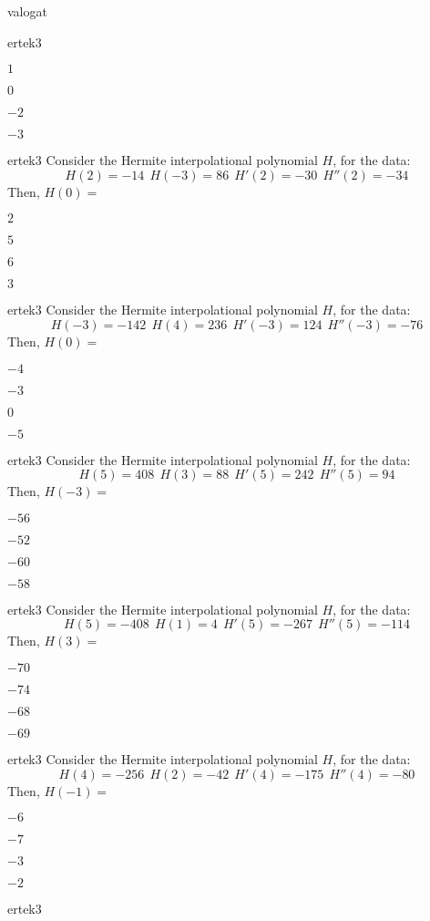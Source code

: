 \documentclass[12pt]{article}
\begin{document}
\begin{quiz}{valogat}
\begin{multi}{ertek3}
\item* $ 1 $
\item  $ 0 $
\item  $ -2 $
\item  $ -3 $
\end{multi}\begin{multi}{ertek3}
Consider the Hermite interpolational polynomial $H$, for the data:
$$
H(2)=-14 \ \ H(-3)=86 \ \ H'(2)=-30 \ \ H''(2)=-34
$$
Then, $H(0)=$
\item* $ 2 $
\item  $ 5 $
\item  $ 6 $
\item  $ 3 $
\end{multi}\begin{multi}{ertek3}
Consider the Hermite interpolational polynomial $H$, for the data:
$$
H(-3)=-142 \ \ H(4)=236 \ \ H'(-3)=124 \ \ H''(-3)=-76
$$
Then, $H(0)=$
\item* $ -4 $
\item  $ -3 $
\item  $ 0 $
\item  $ -5 $
\end{multi}\begin{multi}{ertek3}
Consider the Hermite interpolational polynomial $H$, for the data:
$$
H(5)=408 \ \ H(3)=88 \ \ H'(5)=242 \ \ H''(5)=94
$$
Then, $H(-3)=$
\item* $ -56 $
\item  $ -52 $
\item  $ -60 $
\item  $ -58 $
\end{multi}\begin{multi}{ertek3}
Consider the Hermite interpolational polynomial $H$, for the data:
$$
H(5)=-408 \ \ H(1)=4 \ \ H'(5)=-267 \ \ H''(5)=-114
$$
Then, $H(3)=$
\item* $ -70 $
\item  $ -74 $
\item  $ -68 $
\item  $ -69 $
\end{multi}\begin{multi}{ertek3}
Consider the Hermite interpolational polynomial $H$, for the data:
$$
H(4)=-256 \ \ H(2)=-42 \ \ H'(4)=-175 \ \ H''(4)=-80
$$
Then, $H(-1)=$
\item* $ -6 $
\item  $ -7 $
\item  $ -3 $
\item  $ -2 $
\end{multi}\begin{multi}{ertek3}

\end{multi}
\end{quiz}
\end{document}
